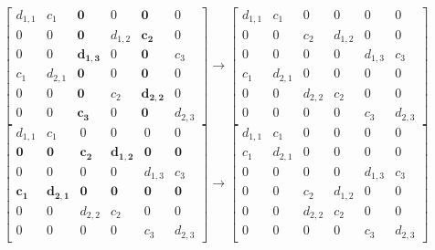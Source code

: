 \documentclass{article}
\begin{document}
\begin{equation*}
\begin{bmatrix}
        d_{1,1}  & c_{1} & \mathbf{0} & 0 & \mathbf{0} & 0 \\
        0 & 0  & \mathbf{0} & d_{1,2} & \mathbf{c_{2}}  & 0 \\
        0 & 0 & \mathbf{d_{1,3}}& 0 & \mathbf{0} & c_{3} \\
        c_{1} & d_{2,1} & \mathbf{0}& 0 & \mathbf{0} & 0 \\
        0 & 0 & \mathbf{0} & c_{2} & \mathbf{d_{2,2}}  & 0 \\
        0 & 0 & \mathbf{c_{3}} & 0 & \mathbf{0} & d_{2,3}
    \end{bmatrix} \longrightarrow
    \begin{bmatrix}
        d_{1,1}  & c_{1} & 0 & 0 & 0& 0 \\
        0 & 0  & c_{2} & d_{1,2} & 0  & 0 \\
        0 & 0 & 0& 0 & d_{1,3} & c_{3} \\
        c_{1} & d_{2,1} & 0& 0 & 0 & 0 \\
        0 & 0 & d_{2,2} & c_{2} & 0  & 0 \\
        0 & 0 & 0 & 0 & c_{3} & d_{2,3}
    \end{bmatrix} 
\end{equation*}
\begin{equation*}
\begin{bmatrix}
        d_{1,1}  & c_{1} & 0 & 0 & 0& 0 \\
        \mathbf{0} & \mathbf{0}  & \mathbf{c_{2}} & \mathbf{d_{1,2}} & \mathbf{0}  & \mathbf{0} \\
        0 & 0 & 0& 0 & d_{1,3} & c_{3} \\
        \mathbf{c_{1}} & \mathbf{d_{2,1}} & \mathbf{0}& \mathbf{0} & \mathbf{0} & \mathbf{0} \\
        0 & 0 & d_{2,2} & c_{2} & 0  & 0 \\
        0 & 0 & 0 & 0 & c_{3} & d_{2,3}
    \end{bmatrix} \longrightarrow 
\begin{bmatrix}
        d_{1,1}  & c_{1} & 0 & 0 & 0& 0 \\
        c_{1} & d_{2,1}  & 0 & 0 & 0  & 0 \\
        0 & 0 & 0& 0 & d_{1,3} & c_{3} \\
        0 & 0 & c_{2}& d_{1,2} & 0 & 0 \\
        0 & 0 & d_{2,2} & c_{2} & 0  & 0 \\
        0 & 0 & 0 & 0 & c_{3} & d_{2,3}
    \end{bmatrix} 
\end{equation*}
\end{document}
